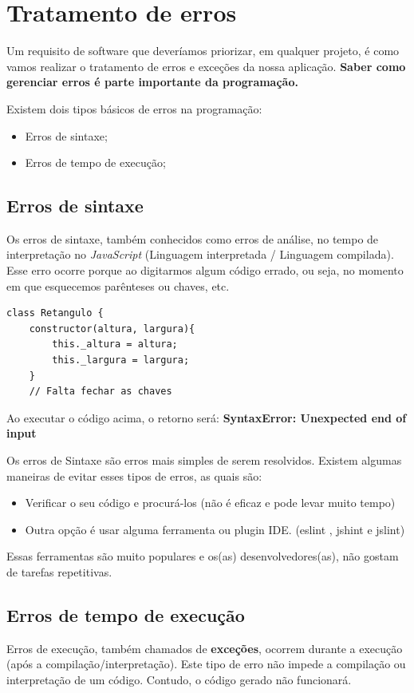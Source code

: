 \section{Tratamento de erros}

Um requisito de software que deveríamos priorizar, em qualquer projeto, é como vamos realizar o tratamento de erros e exceções da nossa aplicação. 
\textbf{Saber como gerenciar erros é parte importante da programação.}

Existem dois tipos básicos de erros na programação:

\begin{itemize}
	\item Erros de sintaxe;
	\item Erros de tempo de execução;
\end{itemize}

\subsection{Erros de sintaxe}
Os erros de sintaxe, também conhecidos como erros de análise, no tempo de interpretação no \textit{JavaScript} (Linguagem interpretada / Linguagem compilada). Esse erro ocorre porque ao digitarmos algum código errado, ou seja, no momento em que esquecemos parênteses ou chaves, etc.	
	
\begin{verbatim}
class Retangulo { 
	constructor(altura, largura){
		this._altura = altura;
		this._largura = largura;
	}	
	// Falta fechar as chaves
\end{verbatim}
		
Ao executar o código acima, o retorno será: \textbf{SyntaxError: Unexpected end of input}

Os erros de Sintaxe são erros mais simples de serem resolvidos. Existem algumas maneiras de evitar esses tipos de erros, as quais são:

\begin{itemize}
	\item Verificar o seu código e procurá-los (não é eficaz e pode levar muito tempo)
	\item Outra opção é usar alguma ferramenta ou plugin IDE. (eslint , jshint e jslint)
\end{itemize}

Essas ferramentas são muito populares e os(as) desenvolvedores(as), não gostam de tarefas repetitivas.


\subsection{Erros de tempo de execução}
Erros de execução, também chamados de \textbf{exceções}, ocorrem durante a execução (após a compilação/interpretação). Este tipo de erro não impede a compilação ou interpretação de um código. Contudo, o código gerado não funcionará.

